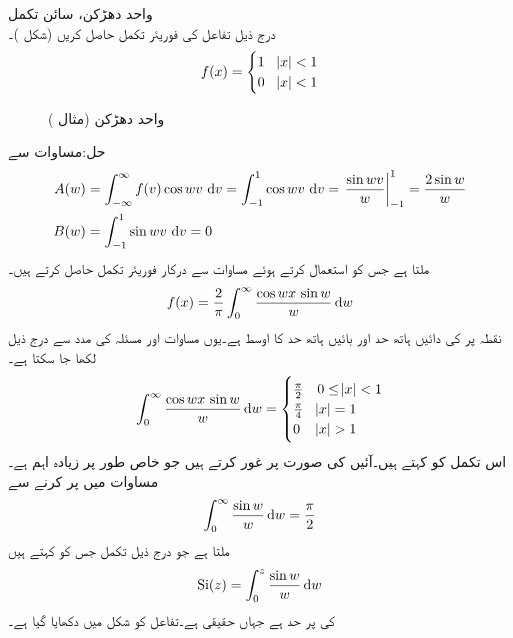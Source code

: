 \quad واحد دھڑکن، سائن تکمل\\
درج ذیل تفاعل کی فوریئر تکمل حاصل کریں (شکل )۔
\begin{align*}
f(x)=
\begin{cases}
1&\abs{x}<1\\
0&\abs{x}<1
\end{cases}
\end{align*}
%
\begin{figure}
\centering
{}
\caption{واحد دھڑکن (مثال )}
\label{شکل_مثال_فوریئر_تکمل_چکور_دھڑکن}
\end{figure}
حل:مساوات  سے
\begin{align*}
A(w)&=\int_{-\infty}^{\infty} f(v)\cos wv\,\dif v=\int_{-1}^{1} \cos wv\,\dif v=\left. \frac{\sin wv}{w}\right|_{-1}^{1}=\frac{2\sin w}{w}\\
B(w)&=\int_{-1}^{1}\sin wv\, \dif v=0
\end{align*}
ملتا ہے جس کو استعمال کرتے ہوئے مساوات  سے درکار فوریئر تکمل حاصل کرتے ہیں۔ 
\begin{align}\label{مساوات_فوریئر_تکمل_ث}
f(x)=\frac{2}{\pi}\int_0^{\infty} \frac{\cos wx\,\sin w}{w}\dif w
\end{align}
نقطہ  پر  کی دائیں ہاتھ حد اور بائیں ہاتھ حد کا اوسط  ہے۔یوں مساوات  اور مسئلہ  کی مدد سے درج ذیل لکھا جا سکتا ہے۔
\begin{align}\label{مساوات_فوریئر_تکمل_ج}
\int_0^{\infty} \frac{\cos wx\,\sin w}{w}\dif w=
\begin{cases}
\frac{\pi}{2}&0\le \abs{x}< 1\\
\frac{\pi}{4}&\abs{x}=1\\
0&\abs{x}>1
\end{cases}
\end{align}
اس تکمل کو  کہتے ہیں۔آئیں  کی صورت پر غور کرتے ہیں جو خاص طور پر زیادہ اہم ہے۔مساوات  میں  پر  کرنے سے
\begin{align}
\int_0^{\infty}\frac{\sin w}{w}\dif w=\frac{\pi}{2}
\end{align}
ملتا ہے جو درج ذیل تکمل جس کو  کہتے ہیں 
\begin{align}\label{مساوات_فوریئر_سائن_تکمل}
\kSi(z)=\int_0^{z}\frac{\sin w}{w}\dif w
\end{align}
کی  پر حد ہے جہاں  حقیقی ہے۔تفاعل  کو شکل  میں دکھایا گیا ہے۔

